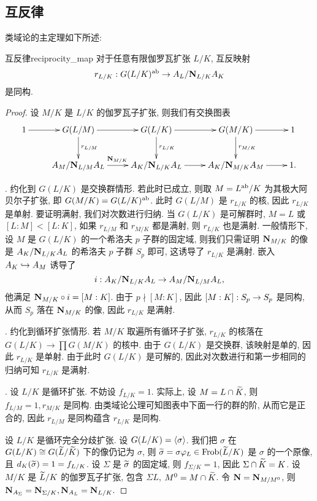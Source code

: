 \subsection{互反律}
类域论的主定理如下所述:

\begin{theorem}{互反律}{reciprocity_map}
对于任意有限伽罗瓦扩张 $L/K$, 互反映射
  \[r_{L/K}:G(L/K)^{\mathrm{ab}}\to A_L/{\mathbf{N}}_{L/K}A_K\]
是同构.
\end{theorem}
\begin{proof}
设 $M/K$ 是 $L/K$ 的伽罗瓦子扩张, 则我们有交换图表
  \[\xymatrix{
    1\ar[r]&G(L/M)\ar[d]^{r_{L/M}}\ar[r]&G(L/K)\ar[d]^{r_{L/K}}\ar[r]&G(M/K)\ar[d]^{r_{M/K}}\ar[r]&1\\
           &A_M/\bfN_{L/M}A_L\ar[r]^{\bfN_{M/K}}&A_K/\bfN_{L/K}A_L\ar[r]&A_K/\bfN_{M/K}A_M\ar[r]&1.
  }\]

.
约化到 $G(L/K)$ 是交换群情形. 若此时已成立, 则取 $M=L^{\mathrm{ab}}/K$ 为其极大阿贝尔子扩张, 即 $G(M/K)=G(L/K)^{\mathrm{ab}}$. 此时 $G(L/M)$ 是 $r_{L/K}$ 的核, 因此 $r_{L/K}$ 是单射. 要证明满射, 我们对次数进行归纳. 当 $G(L/K)$ 是可解群时, $M=L$ 或 $[L:M]<[L:K]$, 如果 $r_{L/M}$ 和 $r_{M/K}$ 都是满射, 则 $r_{L/K}$ 也是满射. 一般情形下, 设 $M$ 是 $G(L/K)$ 的一个希洛夫 $p$ 子群的固定域, 则我们只需证明 ${\mathbf{N}}_{M/K}$ 的像是 $A_K/{\mathbf{N}}_{L/K}A_L$ 的希洛夫 $p$ 子群 $S_p$ 即可, 这诱导了 $r_{L/K}$ 是满射. 嵌入 $A_K\hookrightarrow A_M$ 诱导了
  \[i:A_K/{\mathbf{N}}_{L/K}A_L\to A_M/{\mathbf{N}}_{L/M}A_L,\] 
他满足 ${\mathbf{N}}_{M/K}\circ i=[M:K]$. 由于 $p\nmid[M:K]$, 因此 $[M:K]:S_p\rightarrow S_p$ 是同构, 从而 $S_p$ 落在 ${\mathbf{N}}_{M/K}$ 的像, 因此 $r_{L/K}$ 是满射.

.
约化到循环扩张情形. 若 $M/K$ 取遍所有循环子扩张, $r_{L/K}$ 的核落在 $G(L/K)\to\prod G(M/K)$ 的核中. 由于 $G(L/K)$ 是交换群, 该映射是单的, 因此 $r_{L/K}$ 是单射. 由于此时 $G(L/K)$ 是可解的, 因此对次数进行和第一步相同的归纳可知 $r_{L/K}$ 是满射.

.
设 $L/K$ 是循环扩张. 不妨设 $f_{L/K}=1$. 实际上, 设 $M=L\cap \widetilde K$, 则 $f_{L/M}=1, r_{M/K}$ 是同构. 由类域论公理可知图表中下面一行的群的阶, 从而它是正合的, 因此 $r_{L/M}$ 是同构蕴含 $r_{L/K}$ 是同构.

设 $L/K$ 是循环完全分歧扩张. 设 $G(L/K)=\langle{\sigma}\rangle$. 我们把 $\sigma$ 在 $G(L/K)\cong G(\widetilde L/\widetilde K)$ 下的像仍记为 $\sigma$, 则 $\widetilde \sigma=\sigma\varphi_L\in{\mathrm{Frob}}(\widetilde L/K)$ 是 $\sigma$ 的一个原像, 且 $d_K(\widetilde \sigma)=1=f_{L/K}$. 设 $\Sigma$ 是 $\widetilde \sigma$ 的固定域, 则 $f_{\Sigma/K}=1$, 因此 $\Sigma\cap \widetilde K=K$. 设 $M/K$ 是 $\widetilde L/K$ 的伽罗瓦子扩张, 包含 $\Sigma L$, $M^0=M\cap\widetilde K$. 令 ${\mathbf{N}}={\mathbf{N}}_{M/M^0}$, 则 ${\mathbf{N}}_{A_\Sigma}={\mathbf{N}}_{\Sigma/K},{\mathbf{N}}_{A_L}={\mathbf{N}}_{L/K}.$


\end{proof}
